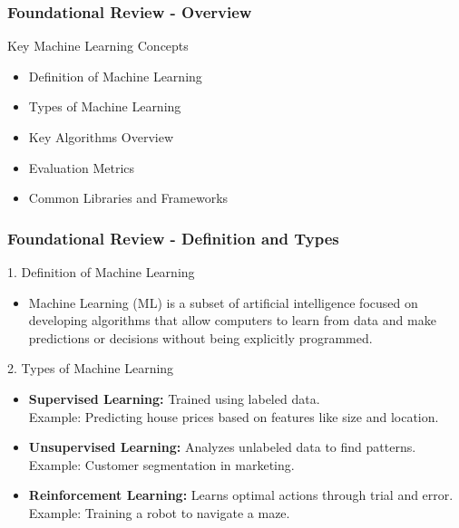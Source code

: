 \documentclass[aspectratio=169]{beamer}
\begin{document}
\begin{frame}[fragile]
    \frametitle{Foundational Review - Overview}
    \begin{block}{Key Machine Learning Concepts}
        \begin{itemize}
            \item Definition of Machine Learning
            \item Types of Machine Learning
            \item Key Algorithms Overview
            \item Evaluation Metrics
            \item Common Libraries and Frameworks
        \end{itemize}
    \end{block}
\end{frame}

\begin{frame}[fragile]
    \frametitle{Foundational Review - Definition and Types}
    \begin{block}{1. Definition of Machine Learning}
        \begin{itemize}
            \item Machine Learning (ML) is a subset of artificial intelligence focused on developing algorithms that allow computers to learn from data and make predictions or decisions without being explicitly programmed.
        \end{itemize}
    \end{block}

    \begin{block}{2. Types of Machine Learning}
        \begin{itemize}
            \item \textbf{Supervised Learning:} Trained using labeled data.\\ 
            Example: Predicting house prices based on features like size and location.
            \item \textbf{Unsupervised Learning:} Analyzes unlabeled data to find patterns.\\ 
            Example: Customer segmentation in marketing.
            \item \textbf{Reinforcement Learning:} Learns optimal actions through trial and error.\\ 
            Example: Training a robot to navigate a maze.
        \end{itemize}
    \end{block}
\end{frame}
\end{document}
